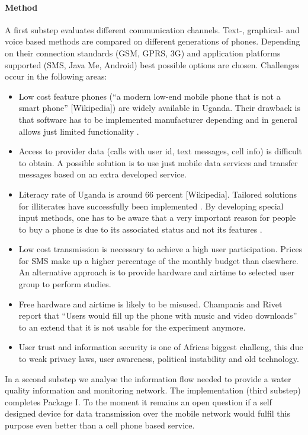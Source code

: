 \documentclass[11pt]{article}
\begin{document}
\paragraph{Method} A first substep evaluates different communication channels. Text-, graphical- and voice based methods are compared on different generations of phones. Depending on their connection standards (GSM, GPRS, 3G) and application platforms supported (SMS, Java Me, Android) best possible options are chosen. Challenges occur in the following areas:
\begin{itemize}
 \item Low cost feature phones (``a modern low-end mobile phone that is not a smart phone'' [Wikipedia]) are widely available in Uganda. Their drawback is that software has to be implemented manufacturer depending and in general allows just limited functionality \cite{champanis2012reporting}.
 \item Access to provider data (calls with user id, text messages, cell info) is difficult to obtain. A possible solution is to use just mobile data services and transfer messages based on an extra developed service.
 \item Literacy rate of Uganda is around 66 percent [Wikipedia]. Tailored solutions for illiterates have successfully been implemented \cite{brown2012water}. By developing special input methods, one has to be aware that a very important reason for people to buy a phone is due to its associated status and not its features \cite{knoche2012text}.
 \item Low cost transmission is necessary to achieve a high user participation. Prices for SMS make up a higher percentage of the monthly budget than elsewhere. An alternative approach is to provide hardware and airtime to selected user group to perform studies.
 \item Free hardware and airtime is likely to be misused. Champanis and Rivet report that ``Users would fill up the phone with music and video downloads'' \cite{champanis2012reporting} to an extend that it is not usable for the experiment anymore.
 \item User trust and information security is one of Africas biggest challeng, this due to weak privacy laws, user awareness, political instability and old technology. \cite{goodman2010coming}
\end{itemize}

In a second substep we analyse the information flow needed to provide a water quality information and monitoring network. The implementation (third substep) completes Package I. To the moment it remains an open question if a self designed device for data transmission over the mobile network would fulfil this purpose even better than a cell phone based service. 
\end{document}
